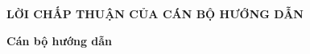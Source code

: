 \documentclass[../../../thesis]{subfiles}
\begin{document}
\begin{center}
    \textbf{\large
        LỜI CHẤP THUẬN CỦA CÁN BỘ HƯỚNG DẪN
    }
\end{center}

\vspace*{6cm}

\begin{changemargin}{9cm}{0cm}
    \textbf{Cán bộ hướng dẫn}
\end{changemargin}

\thispagestyle{empty}

\clearpage
\end{document}
